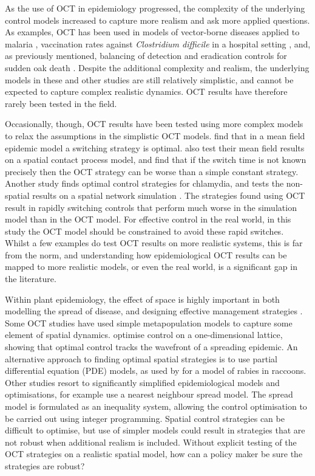 As the use of OCT in epidemiology progressed, the complexity of the underlying control models increased to capture more realism and ask more applied questions. As examples, OCT has been used in models of vector-borne diseases applied to malaria \citep{blayneh_optimal_2009}, vaccination rates against \emph{Clostridium difficile} in a hospital setting \citep{stephenson_optimal_2017}, and, as previously mentioned, balancing of detection and eradication controls for sudden oak death \citep{ndeffo_mbah_balancing_2010}. Despite the additional complexity and realism, the underlying models in these and other studies are still relatively simplistic, and cannot be expected to capture complex realistic dynamics. OCT results have therefore rarely been tested in the field.

Occasionally, though, OCT results have been tested using more complex models to relax the assumptions in the simplistic OCT models. \citet{forster_optimizing_2007} find that in a mean field epidemic model a switching strategy is optimal. \citeauthor{forster_optimizing_2007} also test their mean field results on a spatial contact process model, and find that if the switch time is not known precisely then the OCT strategy can be worse than a simple constant strategy. Another study finds optimal control strategies for chlamydia, and tests the non-spatial results on a spatial network simulation \citep{clarke_approximating_2013}. The strategies found using OCT result in rapidly switching controls that perform much worse in the simulation model than in the OCT model. For effective control in the real world, in this study the OCT model should be constrained to avoid these rapid switches. Whilst a few examples do test OCT results on more realistic systems, this is far from the norm, and understanding how epidemiological OCT results can be mapped to more realistic models, or even the real world, is a significant gap in the literature.

Within plant epidemiology, the effect of space is highly important in both modelling the spread of disease, and designing effective management strategies \citep{ostfeld_spatial_2005, plantegenest_landscape_2007}. Some OCT studies have used simple metapopulation models to capture some element of spatial dynamics. \citet{ndeffo_mbah_optimal_2014} optimise control on a one-dimensional lattice, showing that optimal control tracks the wavefront of a spreading epidemic. An alternative approach to finding optimal spatial strategies is to use partial differential equation (PDE) models, as used by \citet{neilan_optimal_2011} for a model of rabies in raccoons. Other studies resort to significantly simplified epidemiological models and optimisations, for example \citet{epanchin_optimal_2012} use a nearest neighbour spread model. The spread model is formulated as an inequality system, allowing the control optimisation to be carried out using integer programming. Spatial control strategies can be difficult to optimise, but use of simpler models could result in strategies that are not robust when additional realism is included. Without explicit testing of the OCT strategies on a realistic spatial model, how can a policy maker be sure the strategies are robust?

